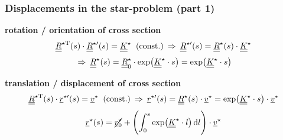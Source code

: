 \begin{frame}
  \frametitle{Displacements in the star-problem (part 1)}

  \textbf{rotation / orientation of cross section}
  \begin{displaymath}
    \underline{\underline{R}}^{\star \mathrm{T}}(s) \cdot \underline{\underline{R}}^{\star \prime}(s) = \underline{\underline{K}}^{\star} \: \text{ (const.)}
    \: \Rightarrow \:
    \underline{\underline{R}}^{\star \prime}(s) = \underline{\underline{R}}^{\star}(s) \cdot \underline{\underline{K}}^{\star}
  \end{displaymath}
  \begin{displaymath}
    \: \Rightarrow \:
    \underline{\underline{R}}^{\star}(s) = \underline{\underline{R}}^{\star}_0 \cdot \exp \bigl( \underline{\underline{K}}^{\star} \cdot s \bigr) = \exp \bigl( \underline{\underline{K}}^{\star} \cdot s \bigr)
  \end{displaymath}
  
  \vspace{0.5em}
  \textbf{translation / displacement of cross section}
  \begin{displaymath}
    \underline{\underline{R}}^{\star \mathrm{T}}(s) \cdot \underline{r}^{\star \prime}(s) = \underline{v}^{\star} \: \text{ (const.)}
    \: \Rightarrow \:
    \underline{r}^{\star \prime}(s) = \underline{\underline{R}}^{\star}(s) \cdot \underline{v}^{\star} =
    \exp \bigl( \underline{\underline{K}}^{\star} \cdot s \bigr) \cdot \underline{v}^{\star}
  \end{displaymath}
  \begin{displaymath}
    \underline{r}^{\star}(s) = \cancel{ \underline{r}^{\star}_0 } + \Biggl( \int_0^s \exp \bigl( \doubleunderline{K}^{\star} \cdot l \bigr) \dif l \Biggr) \cdot \underline{v}^{\star}
  \end{displaymath}
  
\end{frame}


